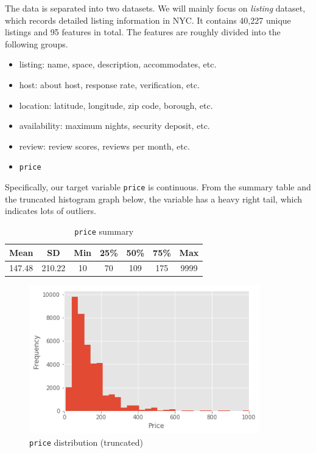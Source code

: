 \documentclass{article}
\begin{document}
	\noindent The data is separated into two datasets. We will mainly focus on \textit{listing} dataset, which records detailed listing information in NYC. It contains 40,227 unique listings and 95 features in total. The features are roughly divided into the following groups.
	\begin{itemize}
		\item listing: name, space, description, accommodates, etc.
		\item host: about host, response rate, verification, etc.
		\item location: latitude, longitude, zip code, borough, etc.
		\item availability: maximum nights, security deposit, etc.
		\item review: review scores, reviews per month, etc.
		\item \texttt{price}
	\end{itemize}
	
	\noindent Specifically, our target variable \texttt{price} is continuous. From the summary table and the truncated histogram graph below, the variable has a heavy right tail, which indicates lots of outliers. 
	
	\begin{table}[h!]
		\centering
		\begin{tabular}{|c|c|c|c|c|c|c|}
			\hline
			Mean   & SD     & Min & 25\% & 50\% & 75\% & Max  \\ \hline
			147.48 & 210.22 & 10  & 70   & 109  & 175  & 9999 \\ \hline
		\end{tabular}
		\caption{\texttt{price} summary}
	\end{table}
	\begin{figure}[h!]
		\centering
		\includegraphics[width=10cm]{figure1}
		\caption{\texttt{price} distribution (truncated)}
	\end{figure}
	
\end{document}
